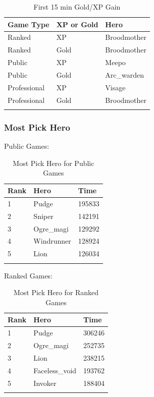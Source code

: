 \documentclass{article}
\begin{document}
\begin{longtable}{|p{2cm}|p{3cm}|p{4.5cm}|}

\hline
\textbf{Game Type} & \textbf{XP or Gold} & \textbf{Hero} \\
\hline
\endhead

Ranked & XP & Broodmother \\\hline
Ranked & Gold & Broodmother \\\hline
Public & XP & Meepo \\\hline
Public & Gold & Arc\_warden \\\hline
Professional & XP & Visage \\\hline
Professional & Gold & Broodmother \\\hline

\caption{First 15 min Gold/XP Gain}
\label{first-15-min-gold-xp-gain}
\end{longtable}


\subsubsection{Most Pick Hero}

Public Games:

\begin{longtable}{|p{2cm}|p{3cm}|p{4.5cm}|}

\hline
\textbf{Rank} & \textbf{Hero} & \textbf{Time} \\
\hline
\endhead

1 & Pudge & 195833 \\\hline
2 & Sniper & 142191 \\\hline
3 & Ogre\_magi & 129292 \\\hline
4 & Windrunner & 128924 \\\hline
5 & Lion & 126034 \\\hline

\caption{Most Pick Hero for Public Games}
\label{most-pick-hero-for-public-games}
\end{longtable}


Ranked Games:

\begin{longtable}{|p{2cm}|p{3cm}|p{4.5cm}|}

\hline
\textbf{Rank} & \textbf{Hero} & \textbf{Time} \\
\hline
\endhead

1 & Pudge & 306246 \\\hline
2 & Ogre\_magi & 252735 \\\hline
3 & Lion & 238215 \\\hline
4 & Faceless\_void & 193762 \\\hline
5 & Invoker & 188404 \\\hline

\caption{Most Pick Hero for Ranked Games}
\label{most-pick-hero-for-ranked-games}
\end{longtable}
\end{document}
